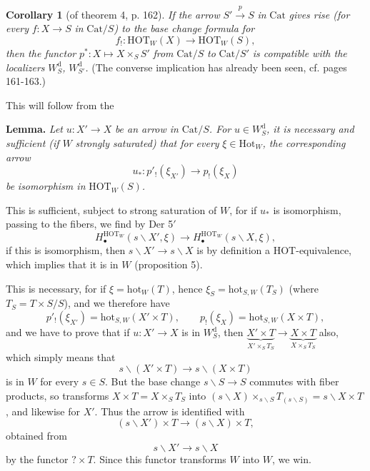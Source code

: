 \documentclass[11pt]{article}
\newcommand{\printedpage}[1]{\marginpar{\footnotesize p.~#1}}
\newcommand{\msp}[1]{\marginpar{\footnotesize [#1]}}
\newcommand{\HOT}{\mathrm{HOT}}
\newcommand{\hot}{\mathrm{hot}}
\newcommand{\Hot}{\mathrm{Hot}}
\newcommand{\Cat}{\mathrm{Cat}}
\newcommand{\bs}{\backslash}
\begin{document}
\noindent\printedpage{102}%
\textbf{Corollary 1} (of theorem 4, p. 162). \textit{If the arrow} $S' \xrightarrow{p} S$ \textit{in} $\Cat$ \textit{gives rise (for every} $f : X \longrightarrow S$ \textit{in} $\Cat/S$\textit{) to the base change formula for}
\[
f_! : \HOT_W(X) \longrightarrow \HOT_W(S),
\]
\textit{then the functor} $p^* : X \longmapsto X \times_S S'$ \textit{from} $\Cat/S$ \textit{to} $\Cat/S'$ \textit{is compatible with the localizers} $W^{\mathrm{d}}_{S}$\textit{,} $W^{\mathrm{d}}_{S'}$\textit{.} (The converse implication has already been seen, cf. pages 161-163.)

This will follow from the

\noindent\textbf{Lemma.} \textit{Let} $u : X' \longrightarrow X$ \textit{be an arrow in} $\Cat/S$\textit{. For} $u \in W^{\mathrm{d}}_{S}$\textit{, it is necessary and sufficient (if $W$} \textit{strongly saturated) that for every} $\xi \in \Hot_W$\textit{, the corresponding arrow}
\[
u_* : p'_!(\xi_{X'}) \longrightarrow p_!(\xi_X)
\]
\textit{be} \textit{isomorphism in} $\HOT_W(S)$\textit{.}

This is sufficient, subject to strong saturation of $W$, for if $u_*$ is isomorphism, passing to the fibers, we find by Der 5$'$
\[
H_\bullet^{\HOT_W}(s\bs X', \xi) \longrightarrow H_\bullet^{\HOT_W}(s\bs X, \xi),
\]
if this is isomorphism, then $s\bs X' \longrightarrow s\bs X$ is by definition a HOT-equivalence, which implies that it is in $W$ (proposition 5).

\msp{page 167}This is necessary, for if $\xi = \hot_W(T)$, hence $\xi_S = \hot_{S,W}(T_S)$ (where $T_S = T \times S/S$), and we therefore have
\[
p'_!(\xi_{X'}) = \hot_{S,W}(X' \times T), \qquad p_!(\xi_X) = \hot_{S,W}(X \times T),
\]
and we have to prove that if $u : X' \longrightarrow X$ is in $W^{\mathrm{d}}_{S}$, then $\underbrace{X' \times T}_{X' \times_S T_S} \longrightarrow \underbrace{X \times T}_{X \times_S T_S}$ also, which simply means that
\[
s\bs(X' \times T) \longrightarrow s\bs(X \times T) \tag*{$(*)$}
\]
is in $W$ for every $s \in S$. But the base change $s\bs S \longrightarrow S$ commutes with fiber products, so transforms $X \times T = X \times_S T_S$ into $(s\bs X) \times_{s\bs S} T_{(s\bs S)} = s\bs X \times T$, and likewise for $X'$. Thus the arrow is identified with
\[
(s\bs X') \times T \longrightarrow (s\bs X) \times T,
\]
obtained from
\[
s\bs X' \longrightarrow s\bs X
\]
by the functor $? \times T$. Since this functor transforms $W$ into $W$, we win.
\end{document}
